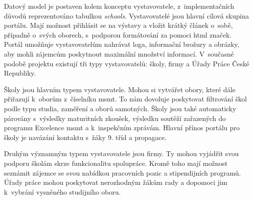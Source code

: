 Datový model \bso{} je postaven kolem konceptu vystavovatele, z~implementačních důvodů reprezentováno tabulkou \emph{schools}. Vystavovatelé jsou hlavní cílová skupina portálu. Mají možnost přihlásit se na výstavy a vložit krátký článek o~sobě, případně o~svých oborech, s~podporou formátování za pomoci \acrshort{html} značek. Portál umožňuje vystavovatelům nahrávat loga, informační brožury a obrázky, aby mohli zájemcům poskytnout maximální množství informací. V~současné podobě projektu \bso{} existují tři typy vystavovatelů: školy, firmy a Úřady Práce České Republiky. 

Školy jsou hlavním typem vystavovatele. Mohou si vytvářet obory, které dále přiřazují k~oborům z~číselníku \acrshort{msmt}. To nám dovoluje poskytovat filtrování škol podle typu studia, zaměření a oborů samotných. Školy jsou také automaticky párovány s~výsledky maturitních zkoušek, výsledku soutěží zařazených do programu Excelence \acrshort{msmt} a k~inspekčním zprávám. Hlavní přínos portálu \bso{} pro školy je navázání kontaktu s~žáky 9. tříd a propagace. 

Druhým významným typem vystavovatele jsou firmy. Ty mohou vyjádřit svou podporu školám skrze funkcionalitu spolupráce. Kromě toho mají možnost seznámit zájemce se svou nabídkou pracovních pozic a stipendijních programů. Úřady práce mohou poskytovat nerozhodným žákům rady a dopomoci jim k~vybrání vysněného studijního oboru.
